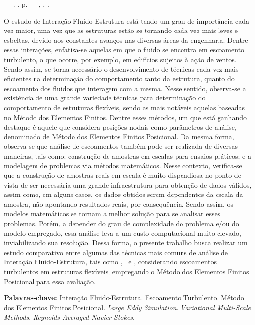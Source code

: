 \documentclass[_ArquivoPrincipal.tex]{subfiles}
\begin{document}
	\setlength{\absparsep}{18pt} %
	\begin{resumo}
		\begin{flushleft} 
			\setlength{\absparsep}{0pt} %
			\SingleSpacing 
			\imprimirautorabr~ ~\textbf{\imprimirtitulo}.	\imprimirdata. \pageref{LastPage}p. 
			\imprimirtipotrabalho~-~\imprimirinstituicao, \imprimirlocal, \imprimirdata. 
		\end{flushleft}
		\OnehalfSpacing
		
		O estudo de Interação Fluido-Estrutura está tendo um grau de importância cada vez maior, uma vez que as estruturas estão se tornando cada vez mais leves e esbeltas, devido aos constantes avanços nas diversas áreas da engenharia. Dentre essas interações, enfatiza-se aquelas em que o fluido se encontra em escoamento turbulento, o que ocorre, por exemplo, em edifícios sujeitos à ação de ventos. Sendo assim, se torna necessário o desenvolvimento de técnicas cada vez mais eficientes na determinação do comportamento tanto da estrutura, quanto do escoamento dos fluidos que interagem com a mesma. Nesse sentido, observa-se a existência de uma grande variedade técnicas para determinação do comportamento de estruturas flexíveis, sendo as mais notáveis aquelas baseadas no Método dos Elementos Finitos. Dentre esses métodos, um que está ganhando destaque é aquele que considera posições nodais como parâmetros de análise, denominado de Método dos Elementos Finitos Posicional. Da mesma forma, observa-se que análise de escoamentos também pode ser realizada de diversas maneiras, tais como: construção de amostras em escalas para ensaios práticos; e a modelagem de problemas via métodos matemáticos. Nesse contexto, verifica-se que a construção de amostras reais em escala é muito dispendiosa no ponto de vista de ser necessária uma grande infraestrutura para obtenção de dados válidos, assim como, em alguns casos, os dados obtidos serem dependentes da escala da amostra, não apontando resultados reais, por consequência. Sendo assim, os modelos matemáticos se tornam a melhor solução para se analisar esses problemas. Porém, a depender do grau de complexidade do problema e/ou do modelo empregado, essa análise leva a um custo computacional muito elevado, inviabilizando sua resolução. Dessa forma, o presente trabalho busca realizar um estudo comparativo entre algumas das técnicas mais comuns de análise de Interação Fluido-Estrutura, tais como \RANS, \LES\ e \VMS, considerando escoamentos turbulentos em estruturas flexíveis, empregando o Método dos Elementos Finitos Posicional para essa avaliação.
		
		\textbf{Palavras-chave:} Interação Fluido-Estrutura. Escoamento Turbulento. Método dos Elementos Finitos Posicional. \textit{Large Eddy Simulation}. \textit{Variational Multi-Scale Methods}. \textit{Reynolds-Averaged Navier-Stokes}.
	\end{resumo}
\end{document}
